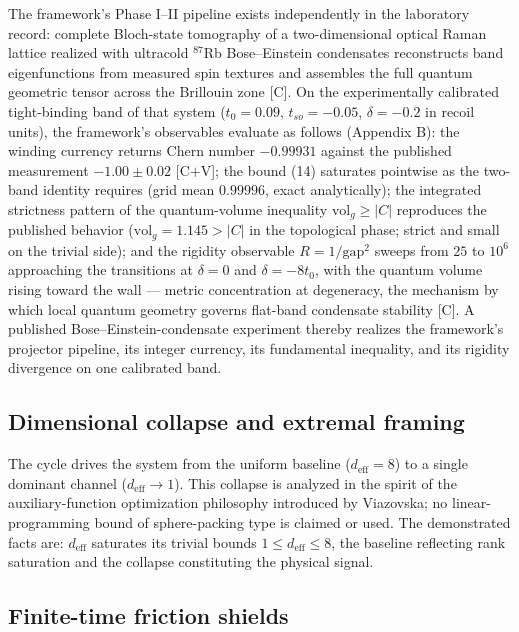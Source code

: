 \documentclass[11pt]{article}
\theoremstyle{definition}
\theoremstyle{plain}
\begin{document}
The framework's Phase I--II pipeline exists independently in the laboratory record:
complete Bloch-state tomography of a two-dimensional optical Raman lattice realized
with ultracold $^{87}$Rb Bose--Einstein condensates reconstructs band
eigenfunctions from measured spin textures and assembles the full quantum geometric
tensor across the Brillouin zone [C]. On the experimentally calibrated
tight-binding band of that system ($t_0 = 0.09$, $t_{so} = -0.05$,
$\delta = -0.2$ in recoil units), the framework's observables evaluate as follows
(Appendix B): the winding currency returns Chern number $-0.99931$ against the
published measurement $-1.00 \pm 0.02$ [C$+$V]; the bound (14) saturates pointwise
as the two-band identity requires (grid mean $0.99996$, exact analytically); the
integrated strictness pattern of the quantum-volume inequality
$\mathrm{vol}_g \ge |C|$ reproduces the published behavior
($\mathrm{vol}_g = 1.145 > |C|$ in the topological phase; strict and small on the
trivial side); and the rigidity observable $R = 1/\mathrm{gap}^2$ sweeps from $25$
to $10^6$ approaching the transitions at $\delta = 0$ and $\delta = -8t_0$, with
the quantum volume rising toward the wall --- metric concentration at degeneracy,
the mechanism by which local quantum geometry governs flat-band condensate
stability [C]. A published Bose--Einstein-condensate experiment thereby realizes
the framework's projector pipeline, its integer currency, its fundamental
inequality, and its rigidity divergence on one calibrated band.

\subsection{Dimensional collapse and extremal framing}

The cycle drives the system from the uniform baseline ($d_{\mathrm{eff}} = 8$) to a
single dominant channel ($d_{\mathrm{eff}} \to 1$). This collapse is analyzed in
the spirit of the auxiliary-function optimization philosophy introduced by
Viazovska; no linear-programming bound of sphere-packing type is claimed or used.
The demonstrated facts are: $d_{\mathrm{eff}}$ saturates its trivial bounds
$1 \le d_{\mathrm{eff}} \le 8$, the baseline reflecting rank saturation and the
collapse constituting the physical signal.

\subsection{Finite-time friction shields}
\end{document}
